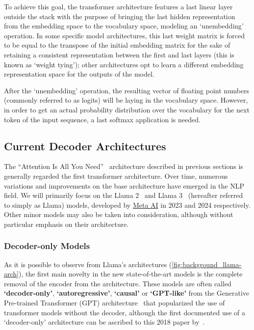 To achieve this goal, the transformer architecture features a last linear layer outside the stack with the purpose of bringing the last hidden representation from the embedding space to the vocabulary space, modeling an `unembedding' operation.
In some specific model architectures, this last weight matrix is forced to be equal to the transpose of the initial embedding matrix for the sake of retaining a consistent representation between the first and last layers (this is known as `weight tying'); other architectures opt to learn a different embedding representation space for the outputs of the model.

After the `unembedding' operation, the resulting vector of floating point numbers (commonly referred to as logits) will be laying in the vocabulary space.
However, in order to get an actual probability distribution over the vocabulary for the next token of the input sequence, a last softmax application is needed.

\subsection{Current Decoder Architectures}\label{ssec:background_transf_current}

The ``Attention Is All You Need''~\cite{vaswani2017} architecture described in previous sections is generally regarded the first transformer architecture.
Over time, numerous variations and improvements on the base architecture have emerged in the NLP field.
We will primarily focus on the Llama 2~\cite{touvron2023} and Llama 3~\cite{dubey2024} (hereafter referred to simply as Llama) models, developed by \href{https://ai.meta.com/}{Meta AI} in 2023 and 2024 respectively.
Other minor models may also be taken into consideration, although without particular emphasis on their architecture.

\subsubsection*{Decoder-only Models}

As it is possible to observe from Llama's architectures (\cref{fig:background_llama-arch}), the first main novelty in the new state-of-the-art models is the complete removal of the encoder from the architecture.
These models are often called \textbf{`decoder-only'}, \textbf{`autoregressive'}, \textbf{`causal'} or \textbf{`GPT-like'} from the Generative Pre-trained Transformer (GPT) architecture~\cite{radford2018,radford2019,brown2020,openai2023} that popularized the use of transformer models without the decoder, although the first documented use of a `decoder-only' architecture can be ascribed to this 2018 paper by~\citet{liu2018}.

